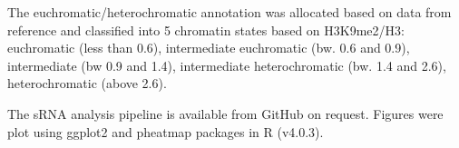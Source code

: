 The euchromatic/heterochromatic annotation was allocated based on data from reference \cite{RN183} and classified into 5 chromatin states based on H3K9me2/H3: euchromatic (less than 0.6), intermediate euchromatic (bw. 0.6 and 0.9), intermediate (bw 0.9 and 1.4), intermediate heterochromatic (bw. 1.4 and 2.6), heterochromatic (above 2.6). 

The sRNA analysis pipeline is available from GitHub on request. Figures were plot using ggplot2 and pheatmap packages in R (v4.0.3).

